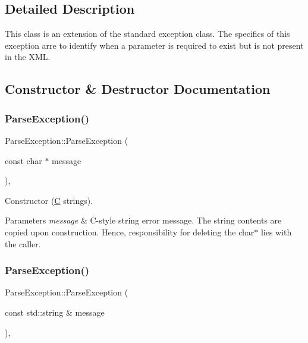 \subsection{Detailed Description}
This class is an extension of the standard exception class. The specifics of this exception arre to identify when a parameter is required to exist but is not present in the X\+ML. 

\subsection{Constructor \& Destructor Documentation}
\mbox{\label{classParseException_a0e2db737183a1801d528102617ddc3c4}} 
\subsubsection{\texorpdfstring{Parse\+Exception()}{ParseException()}\hspace{0.1cm}{\footnotesize\ttfamily [1/6]}}
{\footnotesize\ttfamily Parse\+Exception\+::\+Parse\+Exception (\begin{DoxyParamCaption}\item[{const char $\ast$}]{message }\end{DoxyParamCaption})\hspace{0.3cm}{\ttfamily [inline]}, {\ttfamily [explicit]}}

Constructor (\hyperlink{classC}{C} strings). 
\begin{DoxyParams}{Parameters}
{\em message} & C-\/style string error message. The string contents are copied upon construction. Hence, responsibility for deleting the char$\ast$ lies with the caller. \\
\hline
\end{DoxyParams}
\mbox{\label{classParseException_a162b338172e869ef6e308b4489abf95b}} 
\subsubsection{\texorpdfstring{Parse\+Exception()}{ParseException()}\hspace{0.1cm}{\footnotesize\ttfamily [2/6]}}
{\footnotesize\ttfamily Parse\+Exception\+::\+Parse\+Exception (\begin{DoxyParamCaption}\item[{const std\+::string \&}]{message }\end{DoxyParamCaption})\hspace{0.3cm}{\ttfamily [inline]}, {\ttfamily [explicit]}}

